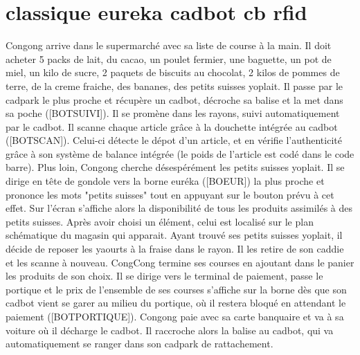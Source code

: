 \section{classique eureka cadbot cb rfid}

Congong arrive dans le supermarché avec sa liste de course à la main. Il doit acheter 5 packs de lait, du cacao, un poulet fermier, une baguette, un pot de miel, un kilo de sucre, 2 paquets de biscuits au chocolat, 2 kilos de pommes de terre, de la creme fraiche, des bananes, des petits suisses yoplait.
Il passe par le cadpark le plus proche et récupère un cadbot, décroche sa balise et la met dans sa poche ([BOTSUIVI]).
Il se promène dans les rayons, suivi automatiquement par le cadbot.
Il scanne chaque article grâce à la douchette intégrée au cadbot ([BOTSCAN]).
Celui-ci détecte le dépot d'un article, et en vérifie l'authenticité grâce à son système 
de balance intégrée (le poids de l'article est codé dans le code barre).
Plus loin, Congong cherche désespérément les petits suisses yoplait.
Il se dirige en tête de gondole vers la borne euréka ([BOEUR]) la plus proche et prononce les mots "petits suisses" tout en appuyant sur le bouton prévu à cet effet.
Sur l'écran s'affiche alors la disponibilité de tous les produits assimilés à des petits suisses.
Après avoir choisi un élément, celui est localisé sur le plan schématique du magasin qui apparait.
Ayant trouvé ses petits suisses yoplait, il décide de reposer les yaourts à la fraise dans le rayon.
Il les retire de son caddie et les scanne à nouveau.
CongCong termine ses courses en ajoutant dans le panier les produits de son choix.
Il se dirige vers le terminal de paiement, passe le portique et le prix de l'ensemble de ses courses s'affiche sur la borne dès que son cadbot vient se garer au milieu du portique, où il restera bloqué en attendant le paiement ([BOTPORTIQUE]).
Congong paie avec sa carte banquaire et va à sa voiture où il décharge le cadbot.
Il raccroche alors la balise au cadbot, qui va automatiquement se ranger dans son cadpark de rattachement.

